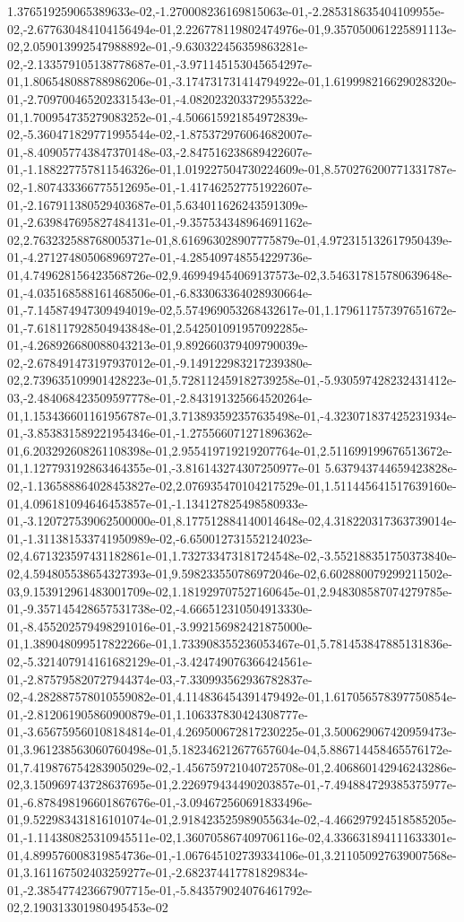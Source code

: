 1.376519259065389633e-02,-1.270008236169815063e-01,-2.285318635404109955e-02,-2.677630484104156494e-01,2.226778119802474976e-01,9.357050061225891113e-02,2.059013992547988892e-01,-9.630322456359863281e-02,-2.133579105138778687e-01,-3.971145153045654297e-01,1.806548088788986206e-01,-3.174731731414794922e-01,1.619998216629028320e-01,-2.709700465202331543e-01,-4.082023203372955322e-01,1.700954735279083252e-01,-4.506615921854972839e-02,-5.360471829771995544e-02,-1.875372976064682007e-01,-8.409057743847370148e-03,-2.847516238689422607e-01,-1.188227757811546326e-01,1.019227504730224609e-01,8.570276200771331787e-02,-1.807433366775512695e-01,-1.417462527751922607e-01,-2.167911380529403687e-01,5.634011626243591309e-01,-2.639847695827484131e-01,-9.357534348964691162e-02,2.763232588768005371e-01,8.616963028907775879e-01,4.972315132617950439e-01,-4.271274805068969727e-01,-4.285409748554229736e-01,4.749628156423568726e-02,9.469949454069137573e-02,3.546317815780639648e-01,-4.035168588161468506e-01,-6.833063364028930664e-01,-7.145874947309494019e-02,5.574969053268432617e-01,1.179611757397651672e-01,-7.618117928504943848e-01,2.542501091957092285e-01,-4.268926680088043213e-01,9.892660379409790039e-02,-2.678491473197937012e-01,-9.149122983217239380e-02,2.739635109901428223e-01,5.728112459182739258e-01,-5.930597428232431412e-03,-2.484068423509597778e-01,-2.843191325664520264e-01,1.153436601161956787e-01,3.713893592357635498e-01,-4.323071837425231934e-01,-3.853831589221954346e-01,-1.275566071271896362e-01,6.203292608261108398e-01,2.955419719219207764e-01,2.511699199676513672e-01,1.127793192863464355e-01,-3.816143274307250977e-01
5.637943744659423828e-02,-1.136588864028453827e-02,2.076935470104217529e-01,1.511445641517639160e-01,4.096181094646453857e-01,-1.134127825498580933e-01,-3.120727539062500000e-01,8.177512884140014648e-02,4.318220317363739014e-01,-1.311381533741950989e-02,-6.650012731552124023e-02,4.671323597431182861e-01,1.732733473181724548e-02,-3.552188351750373840e-02,4.594805538654327393e-01,9.598233550786972046e-02,6.602880079299211502e-03,9.153912961483001709e-02,1.181929707527160645e-01,2.948308587074279785e-01,-9.357145428657531738e-02,-4.666512310504913330e-01,-8.455202579498291016e-01,-3.992156982421875000e-01,1.389048099517822266e-01,1.733908355236053467e-01,5.781453847885131836e-02,-5.321407914161682129e-01,-3.424749076366424561e-01,-2.875795820727944374e-03,-7.330993562936782837e-02,-4.282887578010559082e-01,4.114836454391479492e-01,1.617056578397750854e-01,-2.812061905860900879e-01,1.106337830424308777e-01,-3.656759560108184814e-01,4.269500672817230225e-01,3.500629067420959473e-01,3.961238563060760498e-01,5.182346212677657604e-04,5.886714458465576172e-01,7.419876754283905029e-02,-1.456759721040725708e-01,2.406860142946243286e-02,3.150969743728637695e-01,2.226979434490203857e-01,-7.494884729385375977e-01,-6.878498196601867676e-01,-3.094672560691833496e-01,9.522983431816101074e-01,2.918423525989055634e-02,-4.466297924518585205e-01,-1.114380825310945511e-02,1.360705867409706116e-02,4.336631894111633301e-01,4.899576008319854736e-01,-1.067645102739334106e-01,3.211050927639007568e-01,3.161167502403259277e-01,-2.682374417781829834e-01,-2.385477423667907715e-01,-5.843579024076461792e-02,2.190313301980495453e-02
